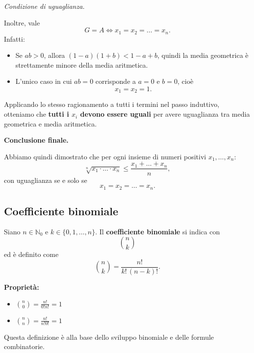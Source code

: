 \documentclass[oneside,10pt]{book} %
\begin{document}
{\textit{Condizione di uguaglianza.}

Inoltre, vale
$$
G = A \iff x_1 = x_2 = \dots = x_n.
$$
Infatti:
\begin{itemize}
\item Se $ab > 0$, allora $(1-a)(1+b) < 1-a+b$, quindi la media geometrica è strettamente minore della media aritmetica.
\item L'unico caso in cui $ab = 0$ corrisponde a $a = 0$ e $b = 0$, cioè
$$
x_1 = x_2 = 1.
$$
\end{itemize}

Applicando lo stesso ragionamento a tutti i termini nel passo induttivo, otteniamo che \textbf{tutti i $x_i$ devono essere uguali} per avere uguaglianza tra media geometrica e media aritmetica.

\textbf{Conclusione finale.}

Abbiamo quindi dimostrato che per ogni insieme di numeri positivi $x_1, \dots, x_n$:
$$
\sqrt[n]{x_1 \cdot \dots \cdot x_n} \leq \frac{x_1 + \dots + x_n}{n},
$$
con uguaglianza se e solo se
$$
x_1 = x_2 = \dots = x_n.
$$
}

\subsection{Coefficiente binomiale}
Siano $n \in \mathbb{N}_{0}$ e $k \in \{0, 1, \dots, n\}$. Il \textbf{coefficiente binomiale} si indica con
$$
\binom{n}{k}
$$
ed è definito come
$$
\binom{n}{k} = \frac{n!}{k! \, (n-k)!}.
$$

\textbf{Proprietà:}
\begin{itemize}
\item $\displaystyle \binom{n}{0} = \frac{n!}{0!n!}=1$
\item $\displaystyle \binom{n}{n} = \frac{n!}{n!0!}= 1$
\end{itemize}

Questa definizione è alla base dello sviluppo binomiale e delle formule combinatorie.
\end{document}
